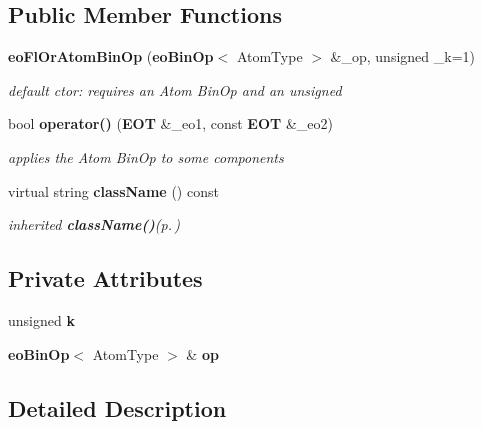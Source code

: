 \subsection*{Public Member Functions}
\begin{CompactItemize}
\item 
{\bf eo\-Fl\-Or\-Atom\-Bin\-Op} ({\bf eo\-Bin\-Op}$<$ Atom\-Type $>$ \&\_\-op, unsigned \_\-k=1)\label{classeo_fl_or_k_atom_bin_op_a0}

\begin{CompactList}\small\item\em default ctor: requires an Atom Bin\-Op and an unsigned \item\end{CompactList}\item 
bool {\bf operator()} ({\bf EOT} \&\_\-eo1, const {\bf EOT} \&\_\-eo2)\label{classeo_fl_or_k_atom_bin_op_a1}

\begin{CompactList}\small\item\em applies the Atom Bin\-Op to some components \item\end{CompactList}\item 
virtual string {\bf class\-Name} () const \label{classeo_fl_or_k_atom_bin_op_a2}

\begin{CompactList}\small\item\em inherited {\bf class\-Name()}{\rm (p.\,\pageref{classeo_fl_or_k_atom_bin_op_a2})} \item\end{CompactList}\end{CompactItemize}
\subsection*{Private Attributes}
\begin{CompactItemize}
\item 
unsigned {\bf k}\label{classeo_fl_or_k_atom_bin_op_r0}

\item 
{\bf eo\-Bin\-Op}$<$ Atom\-Type $>$ \& {\bf op}\label{classeo_fl_or_k_atom_bin_op_r1}

\end{CompactItemize}


\subsection{Detailed Description}
